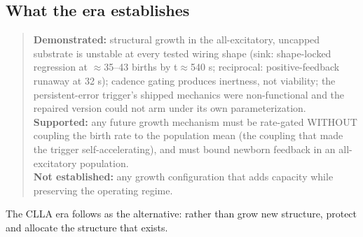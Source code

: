 \subsection{What the era establishes}

\begin{quote}
\textbf{Demonstrated:} structural growth in the all-excitatory,
uncapped substrate is unstable at every tested wiring shape (sink:
shape-locked regression at \(\approx\)35--43 births by
t\(\approx\)540 s; reciprocal: positive-feedback runaway at 32 s);
cadence gating produces inertness, not viability; the persistent-error
trigger's shipped mechanics were non-functional and the repaired
version could not arm under its own parameterization.\\[1pt]
\textbf{Supported:} any future growth mechanism must be rate-gated
WITHOUT coupling the birth rate to the population mean (the coupling
that made the trigger self-accelerating), and must bound newborn
feedback in an all-excitatory population.\\[1pt]
\textbf{Not established:} any growth configuration that adds capacity
while preserving the operating regime.
\end{quote}

The CLLA era follows as the alternative: rather than grow new
structure, protect and allocate the structure that exists.